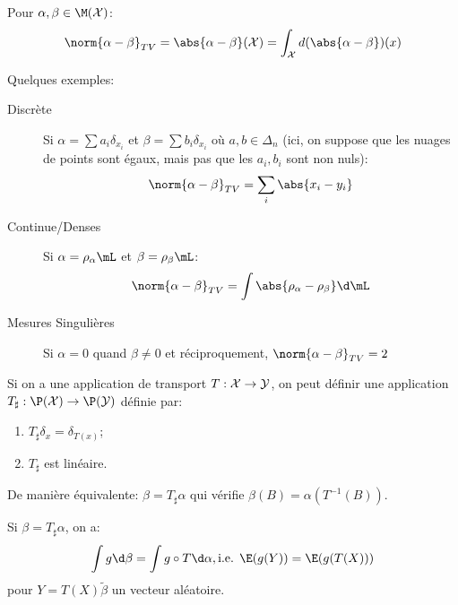 \begin{proposition}
	Pour $\alpha, \beta \in \M(\X)$:
	\begin{equation*}
		\norm{\alpha - \beta}_{TV} = \abs{\alpha - \beta}(\X) = \int_{\X} d(\abs{\alpha -\beta})(x)
	\end{equation*}
\end{proposition}
Quelques exemples:
\begin{description}
	\item[Discrète] Si $\alpha = \sum a_{i}\delta_{x_{i}}$ et $\beta = \sum b_{i}\delta_{x_{i}}$ où $a, b \in \Delta_{n}$ (ici, on suppose que les nuages de points sont égaux, mais pas que les $a_{i}, b_{i}$ sont non nuls):
	      \begin{equation*}
		      \norm{\alpha - \beta}_{TV} = \sum_{i} \abs{x_{i} - y_{i}}
	      \end{equation*}
	\item[Continue/Denses] Si $\alpha = \rho_{\alpha}\mL$ et $\beta = \rho_{\beta}\mL$:
	      \begin{equation*}
		      \norm{\alpha - \beta}_{TV} = \int \abs{\rho_{\alpha} - \rho_{\beta}}\d\mL
	      \end{equation*}
	\item[Mesures Singulières] Si $\alpha = 0$ quand $\beta \neq 0$ et réciproquement, $\norm{\alpha - \beta}_{TV} = 2$
\end{description}

\begin{definition}
	Si on a une application de transport $T: \mathcal{X} \to \mathcal{Y}$, on peut définir une application $T_{\sharp}: \P(\X) \to \P(\Y)$ définie par:
	\begin{enumerate}
		\item $T_{\sharp}\delta_{x} = \delta_{T(x)}$;
		\item $T_{\sharp}$ est linéaire.
	\end{enumerate}
	De manière équivalente: $\beta = T_{\sharp}\alpha$ qui vérifie $\beta(B) = \alpha(T^{-1}(B))$.
\end{definition}

\begin{proposition}
	Si $\beta = T_{\sharp}\alpha$, on a:
	\begin{equation*}
		\int g\d\beta = \int g \circ T \d\alpha, \text{i.e. } \E(g(Y)) = \E(g(T(X)))
	\end{equation*}
	pour $Y = T(X)\tilde \beta$ un vecteur aléatoire.
\end{proposition}


